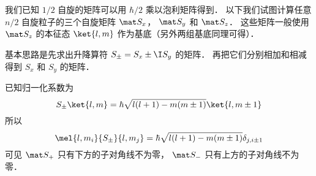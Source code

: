 

我们已知 $1/2$ 自旋的矩阵可以用 $\hbar/2$ 乘以泡利矩阵得到． 以下我们试图计算任意 $n/2$ 自旋粒子的三个自旋矩阵 $\mat S_x$， $\mat S_y$ 和 $\mat S_z$． 这些矩阵一般使用 $\mat S_z$ 的本征态 $\ket{l, m}$ 作为基底（另外两组基底同理可得）．

基本思路是先求出升降算符 $S_\pm = S_x \pm \I S_y$ 的矩阵． 再把它们分别相加和相减得到 $S_x$ 和 $S_y$ 的矩阵．

已知归一化系数为
\begin{equation}
S_\pm \ket{l,m} = \hbar \sqrt{l(l + 1) - m(m \pm 1)} \ket{l,m\pm1}
\end{equation}
所以
\begin{equation}
\mel{l,m_i}{S_\pm}{l,m_j} = \hbar \sqrt{l(l + 1) - m(m \pm 1)} \delta_{j, i\pm1}
\end{equation}
可见 $\mat S_+$ 只有下方的子对角线不为零， $\mat S_-$ 只有上方的子对角线不为零．
